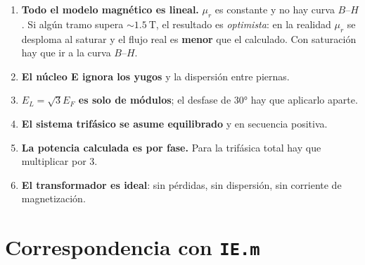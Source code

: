 \documentclass[11pt,a4paper]{article}
\newcommand{\mur}{\mu_r}
\newcommand{\fn}[1]{\texttt{#1}}        %
\begin{document}
\begin{enumerate}[leftmargin=*]
  \item \textbf{Todo el modelo magnético es lineal.} $\mur$ es constante y no hay curva
        $B$--$H$. Si algún tramo supera $\sim\qty{1.5}{\tesla}$, el resultado es
        \emph{optimista}: en la realidad $\mur$ se desploma al saturar y el flujo real es
        \textbf{menor} que el calculado. Con saturación hay que ir a la curva $B$--$H$.
  \item \textbf{El núcleo E ignora los yugos} y la dispersión entre piernas.
  \item \textbf{$E_L = \sqrt{3}E_F$ es solo de módulos}; el desfase de \ang{30} hay que
        aplicarlo aparte.
  \item \textbf{El sistema trifásico se asume equilibrado} y en secuencia positiva.
  \item \textbf{La potencia calculada es por fase.} Para la trifásica total hay que
        multiplicar por 3.
  \item \textbf{El transformador es ideal}: sin pérdidas, sin dispersión, sin corriente de
        magnetización.
\end{enumerate}

\appendix
\section{Correspondencia con \fn{IE.m}}
\end{document}

